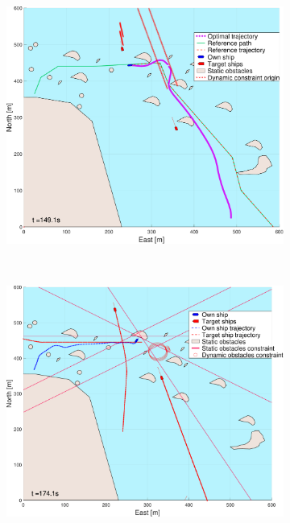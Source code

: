 \begin{figure}[ht]
    \hfill
    \begin{subfigure}[b]{0.494\textwidth}
        \centering
        \includegraphics[width=\textwidth]{Images/NewFigures/skjergard_m_trafikk_NEW/_Simple_1fig999_time=150}
        \subcaption{}
    \end{subfigure}
    \hfill
    \\
    \begin{subfigure}[b]{0.494\textwidth}
        \centering
        \includegraphics[width=\textwidth]{Images/NewFigures/skjergard_m_trafikk_NEW/_Simple_1fig1_time=175}

\end{subfigure}
\end{figure}
